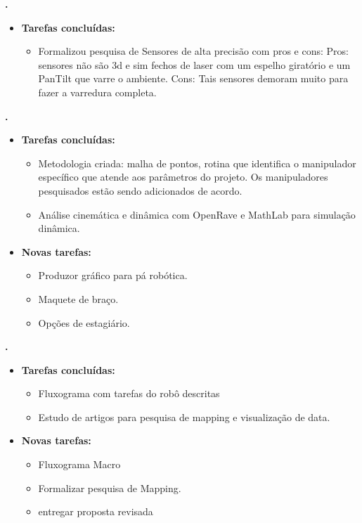 			
   \textbf{\gabriel.} 
	\begin{itemize}
		\item \textbf{Tarefas concluídas:}
			\begin{itemize}    
				\item Formalizou pesquisa de Sensores de alta precisão com pros e cons:
				Pros: sensores não são 3d e sim fechos de laser com um espelho giratório e
				um PanTilt que varre o ambiente.
				Cons: Tais sensores demoram muito para fazer a varredura completa.
			\end{itemize}
		
	\end{itemize}

			
\textbf{.} 
	\begin{itemize}
		\item \textbf{Tarefas concluídas:}
			\begin{itemize}    
				\item Metodologia criada: malha de pontos, rotina que identifica o
				manipulador específico que atende aos parâmetros do projeto. Os
				manipuladores pesquisados estão sendo adicionados de acordo.
				\item Análise cinemática e dinâmica com OpenRave e MathLab para simulação
				dinâmica.
			\end{itemize}
		
		\item \textbf{Novas tarefas:}
			\begin{itemize} 
				\item Produzor gráfico para pá robótica.
				\item Maquete de braço.
				\item Opções de estagiário.
			\end{itemize}
	\end{itemize}
	
		
   \textbf{\julia.} 
	\begin{itemize}
		\item \textbf{Tarefas concluídas:}
			\begin{itemize}    
				\item Fluxograma com tarefas do robô descritas
			    \item Estudo de artigos para pesquisa de mapping e visualização de data.
			\end{itemize}
		
		\item \textbf{Novas tarefas:}
			\begin{itemize} 
			 \item Fluxograma Macro
			 \item Formalizar pesquisa de Mapping.
			 \item entregar proposta revisada
			\end{itemize}
	\end{itemize}

